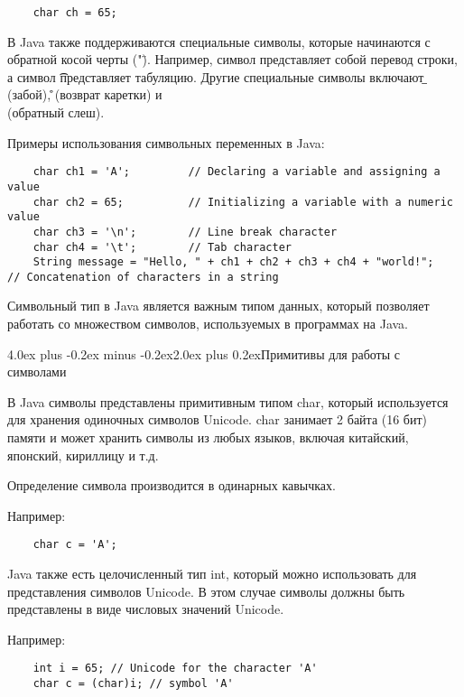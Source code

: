 \documentclass[12pt, a4paper]{book}%
\makeatletter
\renewcommand{\section}{\@startsection{section}{1}{1pt}%
{4.0ex plus -0.2ex minus -0.2ex}{2.0ex plus 0.2ex}{\centering\bf}}%
\makeatother
\begin{document}
{\begin{lstlisting}
    char ch = 65;
\end{lstlisting}

В Java также поддерживаются специальные символы, которые начинаются с обратной косой черты ("\"). Например, символ {\bf \n }представляет собой перевод строки, а символ {\bf \t }представляет табуляцию. Другие специальные символы включают {\bf \b } (забой), {\bf \r }(возврат каретки) и \\ (обратный слеш).


Примеры использования символьных переменных в Java:

\begin{lstlisting}
    char ch1 = 'A';         // Declaring a variable and assigning a value
    char ch2 = 65;          // Initializing a variable with a numeric value
    char ch3 = '\n';        // Line break character
    char ch4 = '\t';        // Tab character
    String message = "Hello, " + ch1 + ch2 + ch3 + ch4 + "world!";   // Concatenation of characters in a string
\end{lstlisting}

Символьный тип в Java является важным типом данных, который позволяет работать со множеством символов, используемых в программах на Java.

\section{Примитивы для работы с символами}

В Java символы представлены примитивным типом char, который используется для хранения одиночных символов Unicode. char занимает 2 байта (16 бит) памяти и может хранить символы из любых языков, включая китайский, японский, кириллицу и т.д.

Определение символа производится в одинарных кавычках. 

Например:
\begin{lstlisting}
    char c = 'A';
\end{lstlisting}

Java также есть целочисленный тип int, который можно использовать для представления символов Unicode. В этом случае символы должны быть представлены в виде числовых значений Unicode. 
 
Например:
\begin{lstlisting}
    int i = 65; // Unicode for the character 'A'
    char c = (char)i; // symbol 'A'
\end{lstlisting}

}
\end{document}
